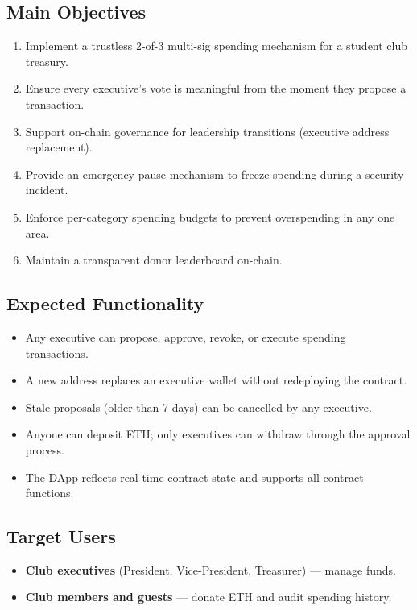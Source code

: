 \documentclass[12pt,a4paper]{article}
\begin{document}
\subsection{Main Objectives}

\begin{enumerate}
  \item Implement a trustless 2-of-3 multi-sig spending mechanism for a student club treasury.
  \item Ensure every executive's vote is meaningful from the moment they propose a transaction.
  \item Support on-chain governance for leadership transitions (executive address replacement).
  \item Provide an emergency pause mechanism to freeze spending during a security incident.
  \item Enforce per-category spending budgets to prevent overspending in any one area.
  \item Maintain a transparent donor leaderboard on-chain.
\end{enumerate}

\subsection{Expected Functionality}

\begin{itemize}
  \item Any executive can propose, approve, revoke, or execute spending transactions.
  \item A new address replaces an executive wallet without redeploying the contract.
  \item Stale proposals (older than 7 days) can be cancelled by any executive.
  \item Anyone can deposit ETH; only executives can withdraw through the approval process.
  \item The DApp reflects real-time contract state and supports all contract functions.
\end{itemize}

\subsection{Target Users}

\begin{itemize}
  \item \textbf{Club executives} (President, Vice-President, Treasurer) — manage funds.
  \item \textbf{Club members and guests} — donate ETH and audit spending history.
\end{itemize}
\end{document}
